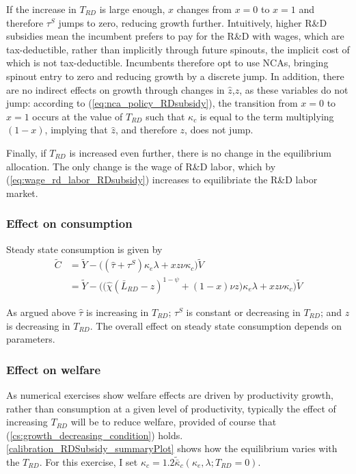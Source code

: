 \documentclass[11pt,english]{article}
\theoremstyle{remark}
\begin{document}
If the increase in $T_{RD}$ is large enough, $x$ changes from $x = 0$ to $x = 1$ and therefore $\tau^S$ jumps to zero, reducing growth further. Intuitively, higher R\&D subsidies mean the incumbent prefers to pay for the R\&D with wages, which are tax-deductible, rather than implicitly through future spinouts, the implicit cost of which is not tax-deductible. Incumbents therefore opt to use NCAs, bringing spinout entry to zero and reducing growth by a discrete jump. In addition, there are no indirect effects on growth through changes in $\hat{z}$,$z$, as these variables do not jump: according to (\ref{eq:nca_policy_RDsubsidy}), the transition from $x= 0$ to $x =1$ occurs at the value of $T_{RD}$ such that $\kappa_c$ is equal to the term multiplying $(1-x)$, implying that $\hat{z}$, and therefore $z$, does not jump.

Finally, if $T_{RD}$ is increased even further, there is no change in the equilibrium allocation. The only change is the wage of R\&D labor, which by (\ref{eq:wage_rd_labor_RDsubsidy}) increases to equilibriate the R\&D labor market.

\subsubsection{Effect on consumption}

Steady state consumption is given by
\begin{align}
\tilde{C} &= \tilde{Y} - \Big( (\hat{\tau}  + \tau^S)\kappa_e \lambda + x z \nu \kappa_c \Big) \tilde{V} \\
&= \tilde{Y} - \Big( \big( \hat{\chi} (\bar{L}_{RD} - z)^{1-\psi} + (1-x) \nu z \big) \kappa_e \lambda + x z \nu \kappa_c \Big) \tilde{V}  \label{cs:scen2:consumption_eq}
\end{align}

As argued above $\hat{\tau}$ is increasing in $T_{RD}$; $\tau^S$ is constant or decreasing in $T_{RD}$; and $z$ is decreasing in $T_{RD}$. The overall effect on steady state consumption depends on parameters. 

\subsubsection{Effect on welfare}

As numerical exercises show welfare effects are driven by productivity growth, rather than consumption at a given level of productivity, typically the effect of increasing $T_{RD}$ will be to reduce welfare, provided of course that (\ref{cs:growth_decreasing_condition}) holds. \autoref{calibration_RDSubsidy_summaryPlot} shows how the equilibrium varies with the $T_{RD}$. For this exercise, I set $\kappa_c = 1.2 \tilde{\bar{\kappa}}_c(\kappa_e,\lambda;T_{RD} = 0)$. 
\end{document}
